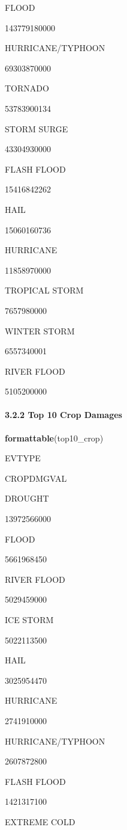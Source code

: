 \documentclass[]{article}
\newenvironment{Shaded}{\begin{snugshade}}{\end{snugshade}}
\newcommand{\KeywordTok}[1]{\textcolor[rgb]{0.13,0.29,0.53}{\textbf{#1}}}
\newcommand{\NormalTok}[1]{#1}
\let\oldparagraph\paragraph
\renewcommand{\paragraph}[1]{\oldparagraph{#1}\mbox{}}
\begin{document}
FLOOD

143779180000

HURRICANE/TYPHOON

69303870000

TORNADO

53783900134

STORM SURGE

43304930000

FLASH FLOOD

15416842262

HAIL

15060160736

HURRICANE

11858970000

TROPICAL STORM

7657980000

WINTER STORM

6557340001

RIVER FLOOD

5105200000

\hypertarget{top-10-crop-damages}{%
\paragraph{3.2.2 Top 10 Crop Damages}\label{top-10-crop-damages}}

\begin{Shaded}
\begin{Highlighting}[]
\KeywordTok{formattable}\NormalTok{(top10_crop)}
\end{Highlighting}
\end{Shaded}

EVTYPE

CROPDMGVAL

DROUGHT

13972566000

FLOOD

5661968450

RIVER FLOOD

5029459000

ICE STORM

5022113500

HAIL

3025954470

HURRICANE

2741910000

HURRICANE/TYPHOON

2607872800

FLASH FLOOD

1421317100

EXTREME COLD
\end{document}
